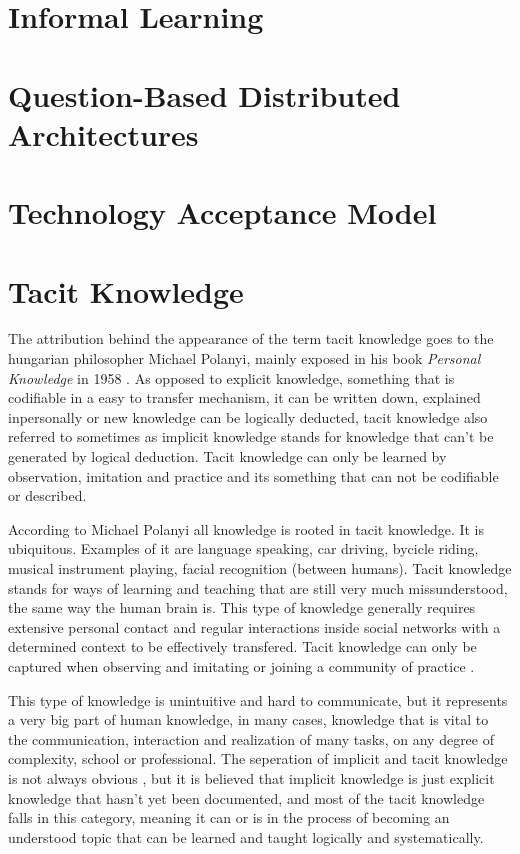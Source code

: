 \section{Informal Learning}
\section{Question-Based Distributed Architectures}
\section{Technology Acceptance Model}



\section{Tacit Knowledge}
\label{section:tacit_knowledge}

The attribution behind the appearance of the term tacit knowledge goes to the 
hungarian philosopher Michael Polanyi, mainly exposed in his book 
\textit{Personal Knowledge} in 1958 \cite{tacitknowledgerevisited}.
As opposed to explicit knowledge, something that is codifiable in a easy to transfer
mechanism, it can be written down, explained inpersonally or new knowledge can be 
logically deducted, tacit knowledge also referred to
sometimes as implicit knowledge stands for knowledge that can't be generated by 
logical deduction. Tacit knowledge can only be learned by observation, imitation and
practice and its something that can not be codifiable or described. \cite{polanyi_1958}

According to Michael Polanyi all knowledge is rooted in tacit knowledge. It is 
ubiquitous. Examples of it are language speaking, car driving, bycicle riding, 
musical instrument playing, facial recognition (between humans). Tacit knowledge 
stands for ways of learning and teaching that are still very much missunderstood, the
same way the human brain is. This type of knowledge generally requires extensive 
personal contact and regular interactions inside social networks with a determined
context to be effectively transfered. Tacit knowledge can only be captured when 
observing and imitating or joining a community of practice \cite{goffin_koners_2011}.

This type of knowledge is unintuitive and hard to communicate, but it represents a 
very big part of human knowledge, in many cases, knowledge that is vital to the 
communication, interaction and realization of many tasks, on any degree of complexity,
school or professional. The seperation of implicit and tacit knowledge is not always
obvious \cite{troublewithtacitknowledge}, but it is believed that implicit knowledge
is just explicit knowledge that hasn't yet been documented, and most of the tacit 
knowledge falls in this category, meaning it can or is in the process of becoming an
understood topic that can be learned and taught logically and systematically.

